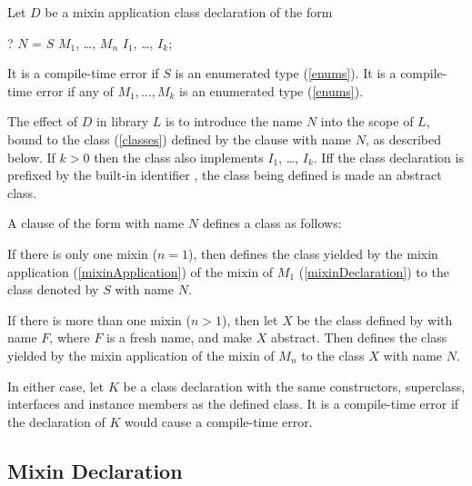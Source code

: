 \documentclass[makeidx]{article}
\begin{document}
\LMHash{}%
Let $D$ be a mixin application class declaration of the form

\begin{normativeDartCode}
\ABSTRACT? \CLASS{} $N$ = $S$ \WITH{} $M_1$, \ldots, $M_n$ \IMPLEMENTS{} $I_1$, \ldots, $I_k$;
\end{normativeDartCode}

\LMHash{}%
It is a compile-time error if $S$ is an enumerated type (\ref{enums}).
It is a compile-time error if any of $M_1, \ldots, M_k$ is an enumerated type
(\ref{enums}).

\LMHash{}%
The effect of $D$ in library $L$ is to introduce the name $N$ into
the scope of $L$, bound to the class (\ref{classes}) defined by the clause
with name $N$, as described below.
If $k > 0$ then the class also implements $I_1$, \ldots, $I_k$.
If{}f the class declaration is prefixed by the built-in identifier \ABSTRACT,
the class being defined is made an abstract class.

\LMHash{}%
A clause of the form 
with name $N$ defines a class as follows:

\LMHash{}%
If there is only one mixin ($n = 1$), then 
defines the class yielded by the mixin application (\ref{mixinApplication})
of the mixin of $M_1$ (\ref{mixinDeclaration}) to the class denoted by
$S$ with name $N$.

\LMHash{}%
If there is more than one mixin ($n > 1$), then
let $X$ be the class defined by 
with name $F$, where $F$ is a fresh name, and make $X$ abstract.
Then  defines the class yielded
by the mixin application of the mixin of $M_n$ to the class $X$ with name $N$.

\LMHash{}%
In either case, let $K$ be a class declaration with
the same constructors, superclass, interfaces and instance members as
the defined class.
It is a compile-time error if the declaration of $K$ would cause
a compile-time error.


\subsection{Mixin Declaration}
\end{document}
